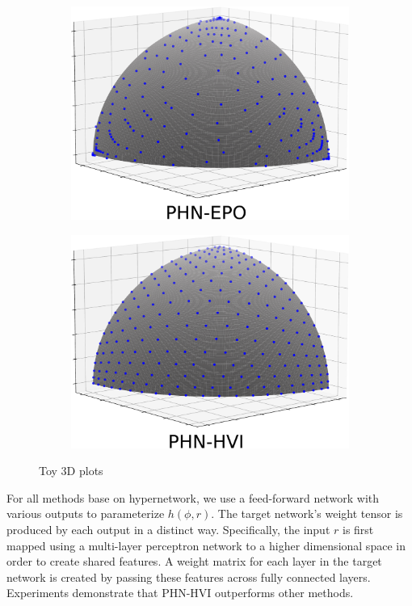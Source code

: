 \documentclass[letterpaper]{article} %
\newcommand{\ourmodel}{PHN-HVI }
\begin{document}
\begin{figure}[!htb]
\begin{subfigure}[b]{0.24\textwidth}
\includegraphics[width=\textwidth]{figures/Toy_4_PHN-EPO.pdf}
\end{subfigure}
\hfill
\begin{subfigure}[b]{0.24\textwidth}
\centering
\includegraphics[width=\textwidth]{figures/Toy_4_PHN-HVI.pdf}
\end{subfigure}
\caption{Toy 3D plots}
\label{fig:3d}
\end{figure}


For all methods base on hypernetwork, we use a feed-forward network with various outputs to parameterize $h(\phi, r)$. The target network's weight tensor is produced by each output in a distinct way. Specifically, the input $r$ is first mapped using a multi-layer perceptron network to a higher dimensional space in order to create shared features. A weight matrix for each layer in the target network is created by passing these features across fully connected layers. Experiments demonstrate that \ourmodel outperforms other methods.
\end{document}
